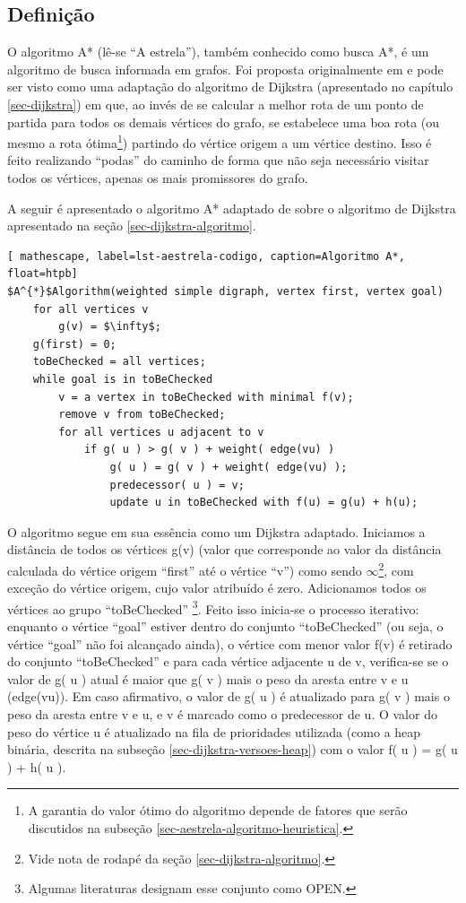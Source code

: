 \subsection{Definição}
\label{sec-aestrela-algoritmo}
O algoritmo A* (lê-se ``A estrela''), também conhecido como busca A*, é um algoritmo de busca informada em grafos. Foi proposta originalmente em  e pode ser visto como uma adaptação do algoritmo de Dijkstra (apresentado no capítulo \ref{sec-dijkstra}) em que, ao invés de se calcular a melhor rota de um ponto de partida para todos os demais vértices do grafo, se estabelece uma boa rota (ou mesmo a rota ótima\footnote{A garantia do valor ótimo do algoritmo depende de fatores que serão discutidos na subseção \ref{sec-aestrela-algoritmo-heuristica}.}) partindo do vértice origem a um vértice destino. Isso é feito realizando ``podas'' do caminho de forma que não seja necessário visitar todos os vértices, apenas os mais promissores do grafo.

A seguir é apresentado o algoritmo A* adaptado de  sobre o algoritmo de Dijkstra apresentado na seção \ref{sec-dijkstra-algoritmo}. 

\begin{lstlisting}[ mathescape, label=lst-aestrela-codigo, caption=Algoritmo A*, float=htpb]
$A^{*}$Algorithm(weighted simple digraph, vertex first, vertex goal)
	for all vertices v
		g(v) = $\infty$;
	g(first) = 0;
	toBeChecked = all vertices;
	while goal is in toBeChecked
		v = a vertex in toBeChecked with minimal f(v);
		remove v from toBeChecked;
		for all vertices u adjacent to v
			if g( u ) > g( v ) + weight( edge(vu) )
				g( u ) = g( v ) + weight( edge(vu) );
				predecessor( u ) = v;
				update u in toBeChecked with f(u) = g(u) + h(u);
\end{lstlisting}

O algoritmo segue em sua essência como um Dijkstra adaptado. Iniciamos a distância de todos os vértices g(v) (valor que corresponde ao valor da distância calculada do vértice origem ``first'' até o vértice ``v'') como sendo $\infty$\footnote{Vide nota de rodapé da seção \ref{sec-dijkstra-algoritmo}.}, com exceção do vértice origem, cujo valor atribuído é zero. Adicionamos todos os vértices ao grupo ``toBeChecked'' \footnote{Algumas literaturas designam esse conjunto como OPEN.}. Feito isso inicia-se o processo iterativo: enquanto o vértice ``goal'' estiver dentro do conjunto ``toBeChecked'' (ou seja, o vértice ``goal'' não foi alcançado ainda), o vértice com menor valor f(v) é retirado do conjunto ``toBeChecked'' e para cada vértice adjacente u de v, verifica-se se o valor de g( u ) atual é maior que g( v ) mais o peso da aresta entre v e u (edge(vu)). Em caso afirmativo, o valor de g( u ) é atualizado para g( v ) mais o peso da aresta entre v e u, e v é marcado como o predecessor de u. O valor do peso do vértice u é atualizado na fila de prioridades utilizada (como a heap binária, descrita na subseção \ref{sec-dijkstra-versoes-heap}) com o valor f( u ) = g( u ) + h( u ).

